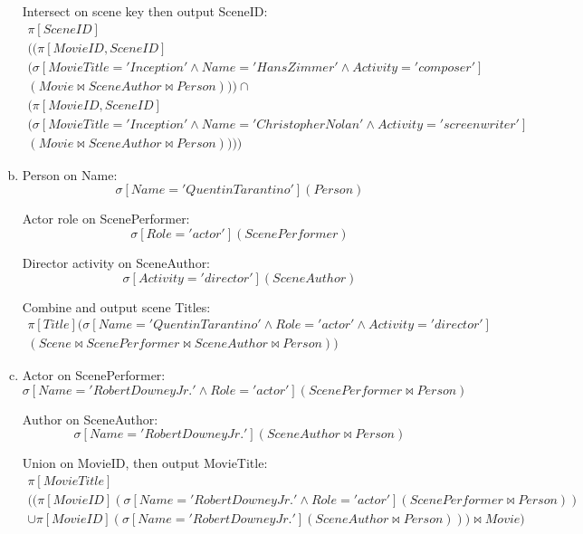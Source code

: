\documentclass{article}
\begin{document}
\begin{enumerate}[(a)]
Intersect on scene key then output SceneID:
\begin{multline}
\pi\left[SceneID\right]\\
((\pi\left[MovieID,SceneID\right]\\
 (\sigma\left[MovieTitle='Inception' \land Name='Hans Zimmer' \land Activity='composer'\right]\\
 (Movie \Join SceneAuthor \Join Person))) \cap \\
 (\pi\left[MovieID,SceneID\right]\\
 (\sigma\left[MovieTitle='Inception' \land Name='Christopher Nolan' \land Activity='screenwriter'\right]\\
 (Movie \Join SceneAuthor \Join Person))))
\end{multline}

\item
Person on Name:
\begin{equation}
\sigma\left[Name='Quentin Tarantino'\right](Person)
\end{equation}

Actor role on ScenePerformer:
\begin{equation}
\sigma\left[Role='actor'\right](ScenePerformer)
\end{equation}

Director activity on SceneAuthor:
\begin{equation}
\sigma\left[Activity='director'\right](SceneAuthor)
\end{equation}

Combine and output scene Titles:
\begin{multline}
\pi\left[Title\right](\sigma\left[Name='Quentin Tarantino' \land Role='actor' \land Activity='director'\right]\\
 (Scene \Join ScenePerformer \Join SceneAuthor \Join Person))
\end{multline}

\item
Actor on ScenePerformer:
\begin{equation}
\sigma\left[Name='Robert Downey Jr.' \land Role='actor'\right](ScenePerformer \Join Person)
\end{equation}

Author on SceneAuthor:
\begin{equation}
\sigma\left[Name='Robert Downey Jr.'\right](SceneAuthor \Join Person)
\end{equation}

Union on MovieID, then output MovieTitle:
\begin{multline}
\pi\left[MovieTitle\right]\\
 ((\pi\left[MovieID\right](\sigma\left[Name='Robert Downey Jr.' \land Role='actor'\right](ScenePerformer \Join Person))\\
 \cup \pi\left[MovieID\right](\sigma\left[Name='Robert Downey Jr.'\right](SceneAuthor \Join Person))) \Join Movie)
\end{multline}


\end{enumerate}
\end{document}
